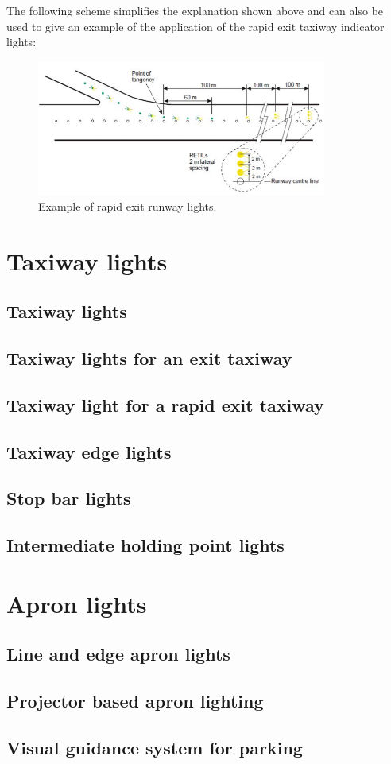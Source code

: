 		The following scheme simplifies the explanation shown above and can also be used to give an example of the application of the rapid exit taxiway indicator lights:
		
		\begin{figure}[H]
			\centering
			\includegraphics[clip, trim=0cm 0cm 0cm 0cm, width=0.85\textwidth]{./images/Annex14/rapidexittaxiways}
			\caption{Example of rapid exit runway lights.} %
			\label{} %
		\end{figure}
	
	\section{Taxiway lights}
		\subsection{Taxiway lights}
		\subsection{Taxiway lights for an exit taxiway}
		\subsection{Taxiway light for a rapid exit taxiway}
		\subsection{Taxiway edge lights}
		\subsection{Stop bar lights}
		\subsection{Intermediate holding point lights}
	
	\section{Apron lights}
		\subsection{Line and edge apron lights}
		\subsection{Projector based apron lighting}
		\subsection{Visual guidance system for parking}
		
		
		

